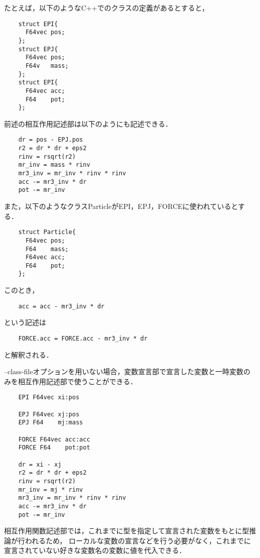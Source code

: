 \documentclass{article}
\begin{document}
たとえば，以下のようなC++でのクラスの定義があるとすると，
\begin{verbatim}
	struct EPI{
	  F64vec pos;
	};
	struct EPJ{
	  F64vec pos;
	  F64v   mass;
	};
	struct EPI{
	  F64vec acc;
	  F64    pot;
	};
\end{verbatim}
前述の相互作用記述部は以下のようにも記述できる．
\begin{verbatim}
	dr = pos - EPJ.pos
	r2 = dr * dr + eps2
	rinv = rsqrt(r2)
	mr_inv = mass * rinv
	mr3_inv = mr_inv * rinv * rinv
	acc -= mr3_inv * dr
	pot -= mr_inv
\end{verbatim}

また，以下のようなクラスParticleがEPI，EPJ，FORCEに使われているとする．
\begin{verbatim}
	struct Particle{
	  F64vec pos;
	  F64    mass;
	  F64vec acc;
	  F64    pot;
	};
\end{verbatim}
このとき，
\begin{verbatim}
	acc = acc - mr3_inv * dr
\end{verbatim}
という記述は
\begin{verbatim}
	FORCE.acc = FORCE.acc - mr3_inv * dr
\end{verbatim}
と解釈される．


--class-fileオプションを用いない場合，変数宣言部で宣言した変数と一時変数のみを相互作用記述部で使うことができる．
\begin{verbatim}
	EPI F64vec xi:pos

	EPJ F64vec xj:pos
	EPJ F64    mj:mass

	FORCE F64vec acc:acc
	FORCE F64    pot:pot

	dr = xi - xj
	r2 = dr * dr + eps2
	rinv = rsqrt(r2)
	mr_inv = mj * rinv
	mr3_inv = mr_inv * rinv * rinv
	acc -= mr3_inv * dr
	pot -= mr_inv
\end{verbatim}

相互作用関数記述部では，これまでに型を指定して宣言された変数をもとに型推論が行われるため，
ローカルな変数の宣言などを行う必要がなく，これまでに宣言されていない好きな変数名の変数に値を代入できる．
\end{document}
